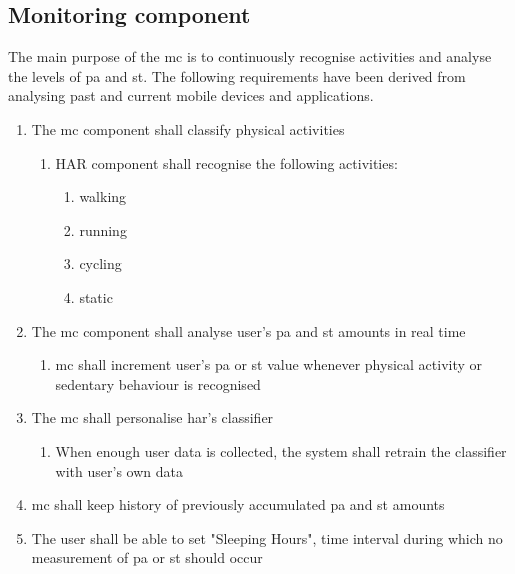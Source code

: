     
    \subsection{Monitoring component}
    The main purpose of the \gls{mc} is to continuously recognise activities and analyse the levels of \gls{pa} and \gls{st}. The following requirements have been derived from analysing past and current mobile devices and applications.
    
    \begin{enumerate}
        \item The \gls{mc} component shall classify physical activities
        \begin{enumerate}
            \item HAR component shall recognise the following activities:
            \begin{enumerate}
                \item walking
                \item running
                \item cycling
                \item static
            \end{enumerate}
        \end{enumerate}
        \item The \gls{mc} component shall analyse user's \gls{pa} and \gls{st} amounts in real time
            \begin{enumerate}
                \item \gls{mc} shall increment user's \gls{pa} or \gls{st} value whenever physical activity or sedentary behaviour is recognised
            \end{enumerate}
        \item The \gls{mc} shall personalise \gls{har}'s classifier
            \begin{enumerate}
                \item When enough user data is collected, the system shall retrain the classifier with user's own data
            \end{enumerate}
            
        \item \gls{mc} shall keep history of previously accumulated \gls{pa} and \gls{st} amounts
        
        \item The user shall be able to set "Sleeping Hours", time interval during which no measurement of \gls{pa} or \gls{st} should occur
      
    \end{enumerate}
    
